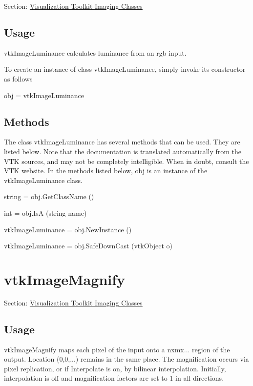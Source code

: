 Section\-: \hyperlink{sec_vtkimaging}{Visualization Toolkit Imaging Classes} \hypertarget{vtkwidgets_vtkxyplotwidget_Usage}{}\subsection{Usage}\label{vtkwidgets_vtkxyplotwidget_Usage}
vtk\-Image\-Luminance calculates luminance from an rgb input.

To create an instance of class vtk\-Image\-Luminance, simply invoke its constructor as follows \begin{DoxyVerb}  obj = vtkImageLuminance
\end{DoxyVerb}
 \hypertarget{vtkwidgets_vtkxyplotwidget_Methods}{}\subsection{Methods}\label{vtkwidgets_vtkxyplotwidget_Methods}
The class vtk\-Image\-Luminance has several methods that can be used. They are listed below. Note that the documentation is translated automatically from the V\-T\-K sources, and may not be completely intelligible. When in doubt, consult the V\-T\-K website. In the methods listed below, {\ttfamily obj} is an instance of the vtk\-Image\-Luminance class. 
\begin{DoxyItemize}
\item {\ttfamily string = obj.\-Get\-Class\-Name ()}  
\item {\ttfamily int = obj.\-Is\-A (string name)}  
\item {\ttfamily vtk\-Image\-Luminance = obj.\-New\-Instance ()}  
\item {\ttfamily vtk\-Image\-Luminance = obj.\-Safe\-Down\-Cast (vtk\-Object o)}  
\end{DoxyItemize}\hypertarget{vtkimaging_vtkimagemagnify}{}\section{vtk\-Image\-Magnify}\label{vtkimaging_vtkimagemagnify}
Section\-: \hyperlink{sec_vtkimaging}{Visualization Toolkit Imaging Classes} \hypertarget{vtkwidgets_vtkxyplotwidget_Usage}{}\subsection{Usage}\label{vtkwidgets_vtkxyplotwidget_Usage}
vtk\-Image\-Magnify maps each pixel of the input onto a nxmx... region of the output. Location (0,0,...) remains in the same place. The magnification occurs via pixel replication, or if Interpolate is on, by bilinear interpolation. Initially, interpolation is off and magnification factors are set to 1 in all directions.


